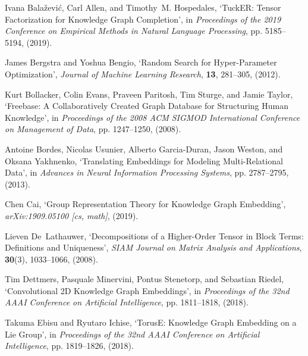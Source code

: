 \documentclass{ecai}
\theoremstyle{plain}  \newtheorem{thm}{Theorem}  \newtheorem{lem}[thm]{Lemma}  \newtheorem{prop}[thm]{Proposition}
\theoremstyle{remark}  \newtheorem*{rem}{Remark}
\begin{document}
\begin{thebibliography}{10}

Ivana Bala{\v z}evi{\'c}, Carl Allen, and Timothy~M. Hospedales, `{{TuckER}}:
  {{Tensor Factorization}} for {{Knowledge Graph Completion}}', in {\em
  Proceedings of the 2019 {{Conference}} on {{Empirical Methods}} in {{Natural
  Language Processing}}}, pp. 5185--5194, (2019).

James Bergstra and Yoshua Bengio, `Random {{Search}} for {{Hyper-Parameter
  Optimization}}', {\em Journal of Machine Learning Research}, {\bf 13},
  281--305, (2012).

Kurt Bollacker, Colin Evans, Praveen Paritosh, Tim Sturge, and Jamie Taylor,
  `Freebase: A {{Collaboratively Created Graph Database}} for {{Structuring
  Human Knowledge}}', in {\em Proceedings of the 2008 {{ACM SIGMOD
  International Conference}} on {{Management}} of {{Data}}}, pp. 1247--1250,
  (2008).

Antoine Bordes, Nicolas Usunier, Alberto {Garcia-Duran}, Jason Weston, and
  Oksana Yakhnenko, `Translating {{Embeddings}} for {{Modeling Multi-Relational
  Data}}', in {\em Advances in {{Neural Information Processing Systems}}}, pp.
  2787--2795, (2013).

Chen Cai, `Group {{Representation Theory}} for {{Knowledge Graph Embedding}}',
  {\em arXiv:1909.05100 [cs, math]}, (2019).

Lieven De~Lathauwer, `Decompositions of a {{Higher-Order Tensor}} in {{Block
  Terms}}: {{Definitions}} and {{Uniqueness}}', {\em SIAM
  Journal on Matrix Analysis and Applications}, {\bf 30}(3),  1033--1066,
  (2008).

Tim Dettmers, Pasquale Minervini, Pontus Stenetorp, and Sebastian Riedel,
  `Convolutional {{2D Knowledge Graph Embeddings}}', in {\em Proceedings of the
  32nd {{AAAI Conference}} on {{Artificial Intelligence}}}, pp. 1811--1818,
  (2018).

Takuma Ebisu and Ryutaro Ichise, `{{TorusE}}: {{Knowledge Graph Embedding}} on
  a {{Lie Group}}', in {\em Proceedings of the 32nd {{AAAI Conference}} on
  {{Artificial Intelligence}}}, pp. 1819--1826, (2018).


\end{thebibliography}
\end{document}
